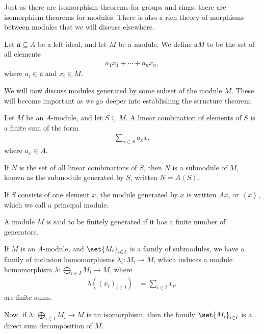 \documentclass[10pt]{mypackage}
\begin{document}
Just as there are isomorphism theorems for groups and rings, there are isomorphism theorems for modules. There is also a rich theory of morphisms between modules that we will discuss elsewhere.
\begin{definition}
  Let $\mathfrak{a}\subseteq A$ be a left ideal, and let $M$ be a module. We define $\mathfrak{a}M$ to be the set of all elements
  \begin{align*}
    a_1x_1 + \cdots + a_nx_n,
  \end{align*}
  where $a_i\in \mathfrak{a}$ and $x_i\in M$.
\end{definition}
We will now discuss modules generated by some subset of the module $M$. These will become important as we go deeper into establishing the structure theorem.
\begin{definition}
  Let $M$ be an $A$-module, and let $S\subseteq M$. A linear combination of elements of $S$ is a finite sum of the form
  \begin{align*}
    \sum_{x\in S}a_x x,
  \end{align*}
  where $a_x\in A$.\newline

  If $N$ is the set of all linear combinations of $S$, then $N$ is a submodule of $M$, known as the submodule generated by $S$, written $N = A\left\langle S \right\rangle$.\newline

  If $S$ consists of one element $x$, the module generated by $x$ is written $Ax$, or $\left\langle x \right\rangle$, which we call a principal module.
\end{definition}
\begin{definition}
  A module $M$ is said to be finitely generated if it has a finite number of generators.
\end{definition}
If $M$ is an $A$-module, and $\set{M_i}_{i\in I}$ is a family of submodules, we have a family of inclusion homomorphisms $\lambda_i\colon M_i\rightarrow M$, which induces a module homomorphism $\lambda\colon \bigoplus_{i\in I}M_i\rightarrow M$, where
\begin{align*}
  \lambda\left( \left( x_i \right)_{i\in I} \right) &= \sum_{i\in I}x_i,
\end{align*}
are finite sums.\newline

Now, if $\lambda\colon \bigoplus_{i\in I}M_i\rightarrow M$ is an isomorphism, then the family $\set{M_i}_{i\in I}$ is a direct sum decomposition of $M$.\newline
\end{document}
